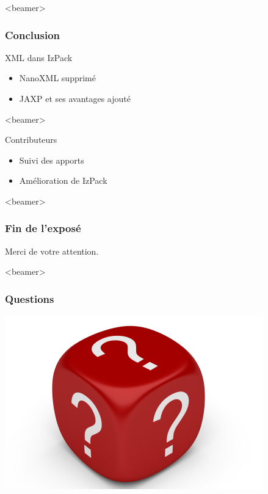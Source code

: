 \begin{frame}<beamer>
\frametitle{Conclusion}
\begin{beamerboxesrounded}[shadow=true]{XML dans IzPack}
\begin{itemize}
	\item NanoXML supprimé
	\item JAXP et ses avantages ajouté
\end{itemize}
\end{beamerboxesrounded}
\end{frame}
\begin{frame}<beamer>
\begin{beamerboxesrounded}[shadow=true]{Contributeurs}
\begin{itemize}
	\item Suivi des apports
	\item Amélioration de IzPack
\end{itemize}
\end{beamerboxesrounded}
\end{frame}
\begin{frame}<beamer>\frametitle{Fin de l'exposé}
\begin{center}
Merci de votre attention.
\end{center}
\end{frame}
\begin{frame}<beamer>\frametitle{Questions}
\begin{center}
\includegraphics[width=.6\linewidth]{../image/questionMark.jpg}
\end{center}
\end{frame}
